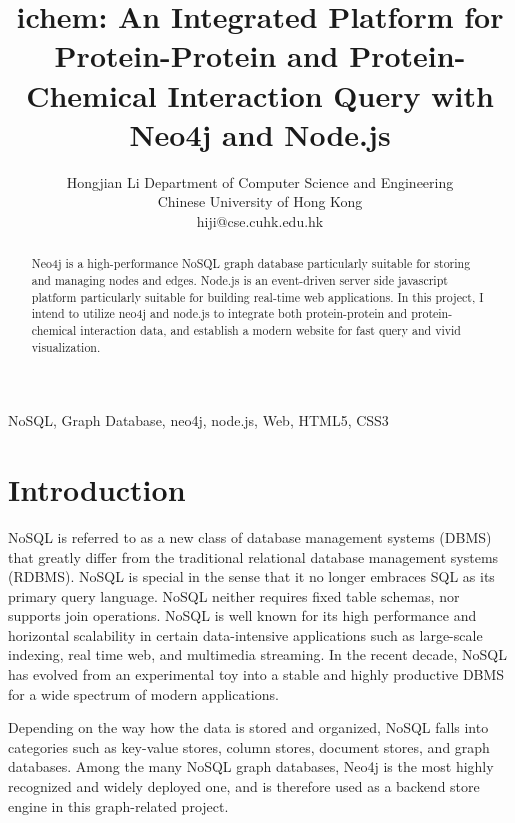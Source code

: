 \documentclass[10pt,conference,compsocconf]{../IEEEtran}
\begin{document}
\title{ichem: An Integrated Platform for Protein-Protein and Protein-Chemical Interaction Query with Neo4j and Node.js} %
\author
{
\IEEEauthorblockN
{
Hongjian Li
\IEEEauthorblockA
{
Department of Computer Science and Engineering\\
Chinese University of Hong Kong\\
hiji@cse.cuhk.edu.hk
}
}
}
\maketitle

\begin{abstract}

Neo4j is a high-performance NoSQL graph database particularly suitable for storing and managing nodes and edges. Node.js is an event-driven server side javascript platform particularly suitable for building real-time web applications. In this project, I intend to utilize neo4j and node.js to integrate both protein-protein and protein-chemical interaction data, and establish a modern website for fast query and vivid visualization.

\end{abstract}

\begin{IEEEkeywords}

NoSQL, Graph Database, neo4j, node.js, Web, HTML5, CSS3

\end{IEEEkeywords}

\section{Introduction}

NoSQL is referred to as a new class of database management systems (DBMS) that greatly differ from the traditional relational database management systems (RDBMS). NoSQL is special in the sense that it no longer embraces SQL as its primary query language. NoSQL neither requires fixed table schemas, nor supports join operations. NoSQL is well known for its high performance and horizontal scalability in certain data-intensive applications such as large-scale indexing, real time web, and multimedia streaming. In the recent decade, NoSQL has evolved from an experimental toy into a stable and highly productive DBMS for a wide spectrum of modern applications.

Depending on the way how the data is stored and organized, NoSQL falls into categories such as key-value stores, column stores, document stores, and graph databases. Among the many NoSQL graph databases, Neo4j \citep{1076} is the most highly recognized and widely deployed one, and is therefore used as a backend store engine in this graph-related project.
\end{document}
